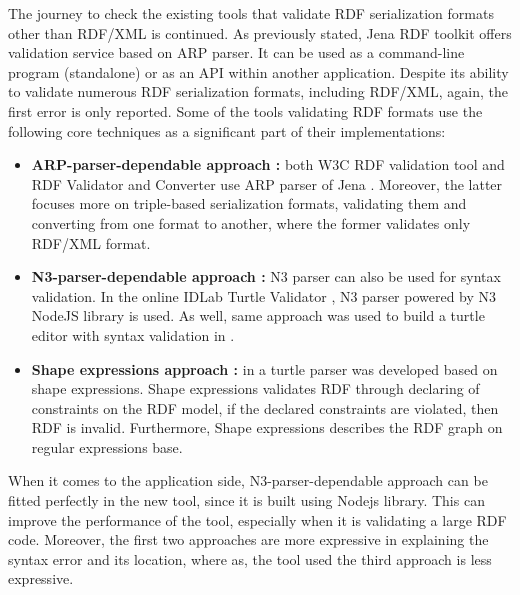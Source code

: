 \par The journey to check the existing tools that validate RDF serialization formats other than RDF/XML is continued. As previously stated, Jena RDF toolkit \cite{McBride:2002:JSW:613357.613755} offers validation service based on ARP parser. It can be used as a command-line program (standalone) or as an API within another application. Despite its ability to validate numerous RDF serialization formats, including RDF/XML, again, the first error is only reported. Some of the tools validating RDF formats use the following core techniques as a significant part of their implementations: \begin{itemize}[noitemsep] 
	\item \textbf{ARP-parser-dependable approach :} both W3C RDF validation tool \cite{W3C:Validation:Online} and RDF Validator and Converter \cite{Mybluemix:Validation:Online} use ARP parser of Jena \cite{McBride:2002:JSW:613357.613755}. Moreover, the latter focuses more on triple-based serialization formats, validating them and converting from one format to another, where the former validates only RDF/XML format. 
	\item \textbf{N3-parser-dependable approach :} N3 parser can also be used for syntax validation. In the online IDLab Turtle Validator \cite{IDLab:Validation:Online}, N3 parser powered by N3 NodeJS library is used. As well, same approach was used to build a turtle editor with syntax validation in \cite{petersenturtleeditor}. 
	\item \textbf{Shape expressions approach :} in \cite{prud2014shape} a turtle parser was developed based on shape expressions. Shape expressions validates RDF through declaring of constraints on the RDF model, if the declared constraints are violated, then RDF is invalid. Furthermore, Shape expressions describes the RDF graph on regular expressions base. 
\end{itemize} 
	\vspace{5mm} %
\par
When it comes to the application side, N3-parser-dependable approach can be fitted perfectly in the new tool, since it is built using Nodejs library. This can improve the performance of the tool, especially when it is validating a large RDF code. Moreover, the first two approaches are more expressive in explaining the syntax error and its location, where as, the tool used the third approach is less expressive.

